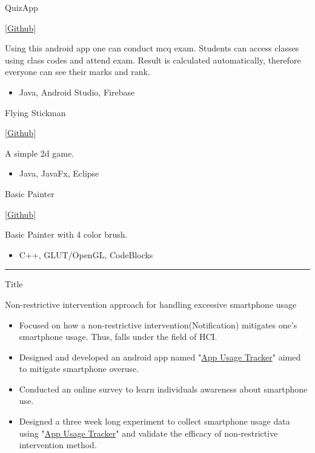 \documentclass[a4paper,10pt]{article}
\newlength{\cvcolumngapwidth}
\newlength{\cvleftcolumnwidth}
\newlength{\cvrightcolumnwidth}
\newcommand{\cvsectionstyle}[1]{{\normalsize\cvsectionfont\textcolor{cvsectioncolor}{#1}}}
\newcommand{\cvtitlestyle}[1]{{\large\cvtitlefont\textcolor{cvtitlecolor}{#1}}}
\newcommand{\cvheadingstyle}[1]{{\normalsize\cvheadingfont\textcolor{cvheadingcolor}{#1}}}
\newlength{\cvafteritemskipamount}
\newlength{\cvaftersectionskipamount}
\newlength{\cvbetweensectionandheadingextraskipamount}
\newlength{\cvaftertitleskipamount}
\newlength{\cvparskip}
\newcommand{\cvsection}[1]{
    \begin{minipage}[t]{\cvleftcolumnwidth}
        \raggedleft\cvsectionstyle{#1}
    \end{minipage}%
    \hspace{\cvcolumngapwidth}%
    \begin{minipage}[t]{\cvrightcolumnwidth}
        \textcolor{cvrulecolor}{\rule{\cvrightcolumnwidth}{0.3mm}}
    \end{minipage}

    \vspace{\cvaftersectionskipamount}
}
\newcommand{\cvitem}[2]{
    \begin{minipage}[t]{\cvleftcolumnwidth}
        \raggedleft #1
    \end{minipage}%
    \hspace{\cvcolumngapwidth}%
    \begin{minipage}[t]{\cvrightcolumnwidth}
        \setlength{\parskip}{\cvparskip} #2
    \end{minipage}

    \vspace{\cvafteritemskipamount}
}
\newcommand{\cvtitle}[1]{
    \cvtitlestyle{#1}

    \vspace{\cvaftertitleskipamount}
    \vspace{-\cvparskip}
}
\begin{document}
\cvitem{
    \cvheadingstyle{QuizApp }
}{
    \cvtitle{\href{https://github.com/diptodeydip/QuizApp-SWEproject}{[Github]}}
    Using this android  app one can conduct mcq exam. Students can access classes using class codes and attend exam.
Result is calculated automatically, therefore everyone can see their marks and rank.
    \begin{itemize}[leftmargin=*]
        \item Java, Android Studio, Firebase
    \end{itemize}
}
\cvitem{
    \cvheadingstyle{Flying Stickman }
}{
    \cvtitle{\href{https://github.com/diptodeydip/FlyingStickman-javalabproject-}{[Github]}}
    A simple 2d game.
    \begin{itemize}[leftmargin=*]
        \item Java, JavaFx, Eclipse
    \end{itemize}
}
\cvitem{
    \cvheadingstyle{Basic Painter }
}{
    \cvtitle{\href{https://github.com/diptodeydip/Basic_Painter_using_GLUT}{[Github]}}
    Basic Painter with 4 color brush.
    \begin{itemize}[leftmargin=*]
        \item C++, GLUT/OpenGL, CodeBlocks
    \end{itemize}
}

\cvsection{Undergraduate Thesis}

\vspace{\cvbetweensectionandheadingextraskipamount}

\cvitem{
    \cvheadingstyle{Title}
}{
    \cvtitle{Non-restrictive intervention approach for handling excessive smartphone usage}

    \begin{itemize}[leftmargin=*]
        \item Focused on how a non-restrictive intervention(Notification) mitigates one's smartphone usage. Thus, falls under the field of HCI.
    \item  Designed and developed an android app named "\href{https://github.com/diptodeydip/App_Usage_Tracker}{App Usage Tracker}" aimed to mitigate smartphone overuse.
    \item Conducted an online survey to learn individuals awareness about smartphone use.
    \item Designed a three week long experiment to collect smartphone
    usage data using "\href{https://github.com/diptodeydip/App_Usage_Tracker}{App Usage Tracker}" and validate the efficacy of non-restrictive intervention method.
    \end{itemize}
}
\end{document}
